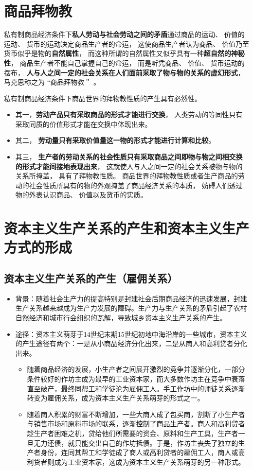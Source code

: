 \documentclass[12pt,openany]{ctexbook}
\begin{document}
\section{商品拜物教}
\begin{mdquote}
私有制商品经济条件下\textbf{私人劳动与社会劳动之间的矛盾}通过商品的运动、 价值的运动、 货币的运动决定商品生产者的命运， 这使商品生产者认为商品、 价值乃至货币似乎是物的\textbf{自然属性}， 而这种所谓的自然属性又似乎具有一种\textbf{超自然的神秘性}， 商品生产者不能自己掌握自己的命运， 而是听凭商品、 价值、 货币运动的摆布， \textbf{人与人之间一定的社会关系在人们面前采取了物与物的关系的虚幻形式}， 马克思称之为 “商品拜物教＂ 。
\end{mdquote}
私有制商品经济条件下商品世界的拜物教性质的产生具有必然性。
\begin{itemize}
  \item 其一，\textbf{劳动产品只有采取商品的形式才能进行交换}， 人类劳动的等同性只有采取同质的价值形式才能在交换中体现出来。 
  \item 其二， \textbf{劳动量只有采取价值量这一物的形式才能进行计算和比较}。 
  \item 其三， \textbf{生产者的劳动关系的社会性质只有采取商品之间即物与物之间相交换的形式才能间接地表现出来}， 这就使人与人之间一定的社会关系被物与物的关系所掩盖， 具有了拜物教性质。 商品世界的拜物教性质或者生产商品的劳动的社会性质所具有的物的外观掩盖了商品经济关系的本质， 妨碍人们透过物的外表认识商品、 价值以及货币的实质。
\end{itemize}
\section{资本主义生产关系的产生和资本主义生产方式的形成}
\subsection{资本主义生产关系的产生（雇佣关系）}
\begin{itemize}
  \item 背景：随着社会生产力的提高特别是封建社会后期商品经济的迅速发展，封建生产关系越来越成为生产力发展的障碍。生产力与生产关系的矛盾引起了农村自然经济和城市行会组织的瓦解，导致城乡资本主义生产关系的产生。
  \item 途径：资本主义萌芽于14世纪末期15世纪初地中海沿岸的一些城市，资本主义的产生途径有两个：一是从小商品经济分化出来，二是从商人和高利贷者分化出来。
\begin{itemize}
  \item 随着商品经济的发展，小生产者之间展开激烈的竞争并逐渐分化，一部分条件较好的作坊主成为最早的工业资本家，而大多数作坊主在竞争中衰落直至破产，最终同帮工和学徒沦为雇佣工人。手工作坊中的师徒关系逐渐转变为雇佣关系，成为资本主义生产关系萌芽的形式之一。
  \item 随着商人积累的财富不断增加，一些大商人成了包买商，割断了小生产者与销售市场和原料市场的联系，逐渐控制了商品生产者。商人和高利贷者趁生产者困难之机，贷给他们所需要的资金、原料和生产工具，生产者一旦无力还债，就只能交出自己的作坊抵债。于是，作坊主丧失了独立的生产者身份，连同其帮工和学徒成了商人或高利贷者的雇佣工人，商人或高利贷者则成为工业资本家，这成为资本主义生产关系萌芽的另一种形式。
\end{itemize}
\end{itemize}
\end{document}
